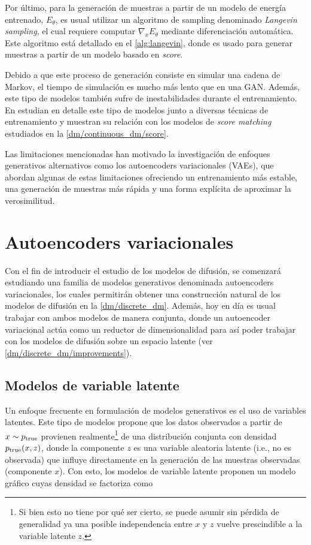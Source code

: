 Por último, para la generación de muestras a partir de un modelo de energía entrenado, $E_\theta$, es usual utilizar un algoritmo de sampling denominado \textit{Langevin sampling}, el cual requiere computar $\nabla_x E_\theta$ mediante diferenciación automática. Este algoritmo está detallado en el \autoref{alg:langevin}, donde es usado para generar muestras a partir de un modelo basado en \textit{score}.

Debido a que este proceso de generación consiste en simular una cadena de Markov, el tiempo de simulación es mucho más lento que en una GAN. Además, este tipo de modelos también sufre de inestabilidades durante el entrenamiento. En \cite{song2021trainenergybasedmodels} estudian en detalle este tipo de modelos junto a diversas técnicas de entrenamiento y muestran su relación con los modelos de \textit{score matching} estudiados en la \autoref{dm/continuous_dm/score}.

Las limitaciones mencionadas han motivado la investigación de enfoques generativos alternativos como los autoencoders variacionales (VAEs), que abordan algunas de estas limitaciones ofreciendo un entrenamiento más estable, una generación de muestras más rápida y una forma explícita de aproximar la verosimilitud.

\section{Autoencoders variacionales}
\label{dm/vae}

Con el fin de introducir el estudio de los modelos de difusión, se comenzará estudiando una familia de modelos generativos denominada autoencoders variacionales, los cuales permitirán obtener una construcción natural de los modelos de difusión en la \autoref{dm/discrete_dm}. Además, hoy en día es usual trabajar con ambos modelos de manera conjunta, donde un autoencoder variacional actúa como un reductor de dimensionalidad para así poder trabajar con los modelos de difusión sobre un espacio latente (ver \autoref{dm/discrete_dm/improvements}).

\subsection{Modelos de variable latente}
\label{dm/vae/latent_models}

Un enfoque frecuente en formulación de modelos generativos es el uso de variables latentes. Este tipo de modelos propone que los datos observados a partir de $x\sim p_{\operatorname{true}}$ provienen realmente\footnote{Si bien esto no tiene por qué ser cierto, se puede asumir sin pérdida de generalidad ya una posible independencia entre $x$ y $z$ vuelve prescindible a la variable latente $z$.} de una distribución conjunta con densidad $p_{\operatorname{true}}(x,z)$, donde la componente $z$ es una variable aleatoria latente (i.e., no es observada) que influye directamente en la generación de las muestras observadas (componente $x$). Con esto, los modelos de variable latente proponen un modelo gráfico cuyas densidad se factoriza como


